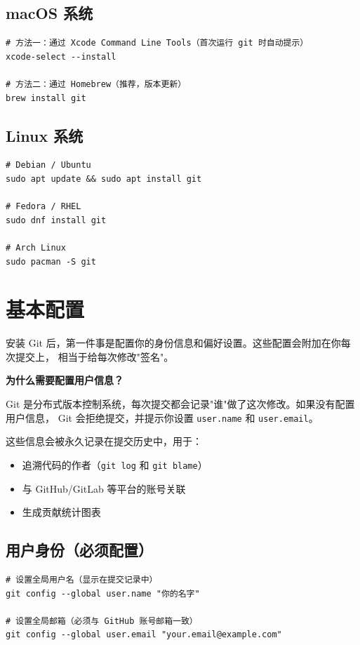 \documentclass[12pt,a4paper,openany]{ctexbook}
\begin{document}
\subsection{macOS 系统}

\begin{lstlisting}[style=shell]
# 方法一：通过 Xcode Command Line Tools（首次运行 git 时自动提示）
xcode-select --install

# 方法二：通过 Homebrew（推荐，版本更新）
brew install git
\end{lstlisting}

\subsection{Linux 系统}

\begin{lstlisting}[style=shell]
# Debian / Ubuntu
sudo apt update && sudo apt install git

# Fedora / RHEL
sudo dnf install git

# Arch Linux
sudo pacman -S git
\end{lstlisting}

\section{基本配置}

安装 Git 后，第一件事是配置你的身份信息和偏好设置。这些配置会附加在你每次提交上，
相当于给每次修改"签名"。

\medskip
\textbf{为什么需要配置用户信息？}

Git 是分布式版本控制系统，每次提交都会记录"谁"做了这次修改。如果没有配置用户信息，
Git 会拒绝提交，并提示你设置 \texttt{user.name} 和 \texttt{user.email}。

这些信息会被永久记录在提交历史中，用于：
\begin{itemize}
  \item 追溯代码的作者（\texttt{git log} 和 \texttt{git blame}）
  \item 与 GitHub/GitLab 等平台的账号关联
  \item 生成贡献统计图表
\end{itemize}
\medskip

\subsection{用户身份（必须配置）}

\begin{lstlisting}[style=shell]
# 设置全局用户名（显示在提交记录中）
git config --global user.name "你的名字"

# 设置全局邮箱（必须与 GitHub 账号邮箱一致）
git config --global user.email "your.email@example.com"
\end{lstlisting}
\end{document}
